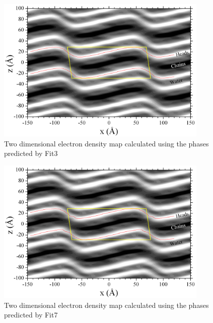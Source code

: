 \begin{figure}
  \centering
  \includegraphics[width=0.9\textwidth]{figures/ripple/LAXS/Fit3_2D_edp}
  \caption[]{Two dimensional electron density map calculated using the phases
  predicted by Fit3}
  \label{fig:Fit3_2D_edp}
\end{figure}

\begin{figure}
  \centering
  \includegraphics[width=0.9\textwidth]{figures/ripple/LAXS/Fit7_2D_edp}
  \caption[]{Two dimensional electron density map calculated using the phases
  predicted by Fit7}
  \label{fig:Fit7_2D_edp}
\end{figure}


